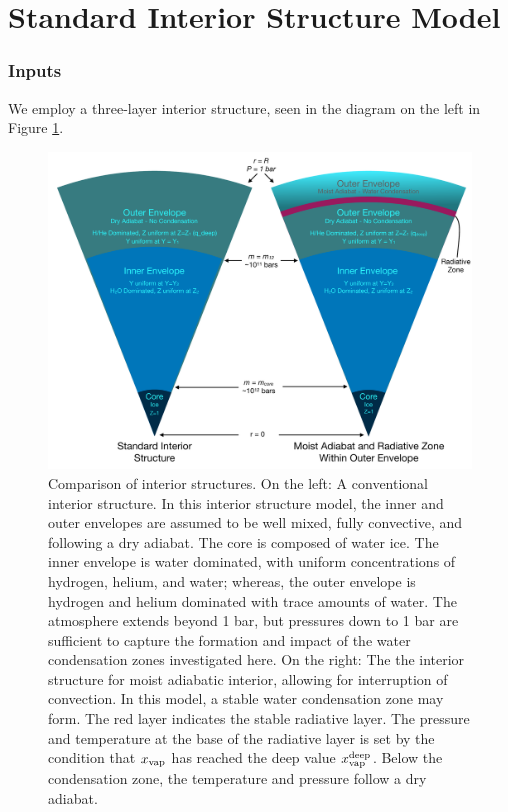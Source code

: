 \documentclass[11pt]{ucscthesisbs}
\begin{document}
\section{Standard Interior Structure Model}
\subsubsection{Inputs}
We employ a three-layer interior structure, seen in the diagram on the left in Figure \ref{fig:standard_dry_interior}. 
\begin{figure}[ht!]
 \centerline{
  \includegraphics[width=\columnwidth]{figures/onion.pdf}
 }
\caption[A Standard Interior Structure Model]
{Comparison of interior structures. On the left: A conventional interior structure. In this interior structure model, the inner and outer envelopes are assumed to be well mixed, fully convective, and following a dry adiabat. The core is composed of water ice. The inner envelope is water dominated, with uniform concentrations of hydrogen, helium, and water; whereas, the outer envelope is hydrogen and helium dominated with trace amounts of water. The atmosphere extends beyond 1 bar, but pressures down to 1 bar are sufficient to capture the formation and impact of the water condensation zones investigated here. On the right: The the interior structure for moist adiabatic interior, allowing for interruption of convection. In this model, a stable water condensation zone may form. The red layer indicates the stable radiative layer. The pressure and temperature at the base of the radiative layer is set by the condition that $x_{\rm vap}$ has reached the deep value $x_{\rm vap}^{\rm deep}$. Below the condensation zone, the temperature and pressure follow a dry adiabat.}
\label{fig:standard_dry_interior}
\end{figure}
\end{document}
